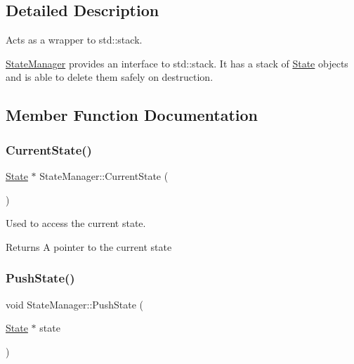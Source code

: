 \subsection{Detailed Description}
Acts as a wrapper to std\+::stack. 

\mbox{\hyperlink{class_state_manager}{State\+Manager}} provides an interface to std\+::stack. It has a stack of \mbox{\hyperlink{class_state}{State}} objects and is able to delete them safely on destruction. 

\subsection{Member Function Documentation}
\mbox{\label{class_state_manager_a76446362726ceb518445e2bdd4814be4}} 
\subsubsection{\texorpdfstring{Current\+State()}{CurrentState()}}
{\footnotesize\ttfamily \mbox{\hyperlink{class_state}{State}} $\ast$ State\+Manager\+::\+Current\+State (\begin{DoxyParamCaption}{ }\end{DoxyParamCaption})}



Used to access the current state. 

\begin{DoxyReturn}{Returns}
A pointer to the current state 
\end{DoxyReturn}
\mbox{\label{class_state_manager_a7c6248e6e74dc09736dcc0ed5a622177}} 
\subsubsection{\texorpdfstring{Push\+State()}{PushState()}}
{\footnotesize\ttfamily void State\+Manager\+::\+Push\+State (\begin{DoxyParamCaption}\item[{\mbox{\hyperlink{class_state}{State}} $\ast$}]{state }\end{DoxyParamCaption})}



